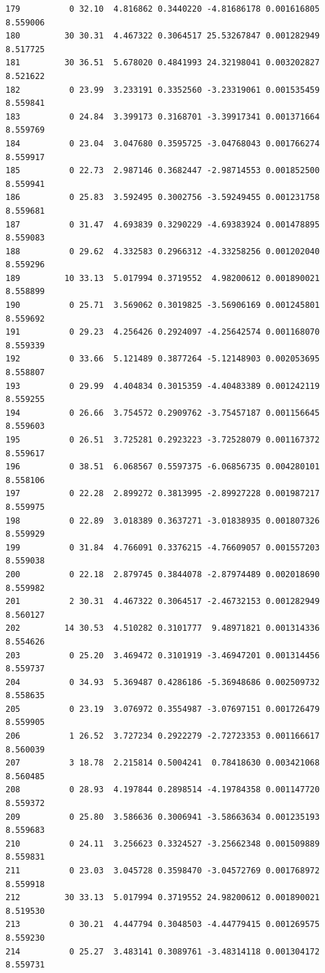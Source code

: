 \documentclass[]{book}
\theoremstyle{definition}
\theoremstyle{definition}
\theoremstyle{definition}
\theoremstyle{remark}
\begin{document}
\begin{verbatim}
179          0 32.10  4.816862 0.3440220 -4.81686178 0.001616805 8.559006
180         30 30.31  4.467322 0.3064517 25.53267847 0.001282949 8.517725
181         30 36.51  5.678020 0.4841993 24.32198041 0.003202827 8.521622
182          0 23.99  3.233191 0.3352560 -3.23319061 0.001535459 8.559841
183          0 24.84  3.399173 0.3168701 -3.39917341 0.001371664 8.559769
184          0 23.04  3.047680 0.3595725 -3.04768043 0.001766274 8.559917
185          0 22.73  2.987146 0.3682447 -2.98714553 0.001852500 8.559941
186          0 25.83  3.592495 0.3002756 -3.59249455 0.001231758 8.559681
187          0 31.47  4.693839 0.3290229 -4.69383924 0.001478895 8.559083
188          0 29.62  4.332583 0.2966312 -4.33258256 0.001202040 8.559296
189         10 33.13  5.017994 0.3719552  4.98200612 0.001890021 8.558899
190          0 25.71  3.569062 0.3019825 -3.56906169 0.001245801 8.559692
191          0 29.23  4.256426 0.2924097 -4.25642574 0.001168070 8.559339
192          0 33.66  5.121489 0.3877264 -5.12148903 0.002053695 8.558807
193          0 29.99  4.404834 0.3015359 -4.40483389 0.001242119 8.559255
194          0 26.66  3.754572 0.2909762 -3.75457187 0.001156645 8.559603
195          0 26.51  3.725281 0.2923223 -3.72528079 0.001167372 8.559617
196          0 38.51  6.068567 0.5597375 -6.06856735 0.004280101 8.558106
197          0 22.28  2.899272 0.3813995 -2.89927228 0.001987217 8.559975
198          0 22.89  3.018389 0.3637271 -3.01838935 0.001807326 8.559929
199          0 31.84  4.766091 0.3376215 -4.76609057 0.001557203 8.559038
200          0 22.18  2.879745 0.3844078 -2.87974489 0.002018690 8.559982
201          2 30.31  4.467322 0.3064517 -2.46732153 0.001282949 8.560127
202         14 30.53  4.510282 0.3101777  9.48971821 0.001314336 8.554626
203          0 25.20  3.469472 0.3101919 -3.46947201 0.001314456 8.559737
204          0 34.93  5.369487 0.4286186 -5.36948686 0.002509732 8.558635
205          0 23.19  3.076972 0.3554987 -3.07697151 0.001726479 8.559905
206          1 26.52  3.727234 0.2922279 -2.72723353 0.001166617 8.560039
207          3 18.78  2.215814 0.5004241  0.78418630 0.003421068 8.560485
208          0 28.93  4.197844 0.2898514 -4.19784358 0.001147720 8.559372
209          0 25.80  3.586636 0.3006941 -3.58663634 0.001235193 8.559683
210          0 24.11  3.256623 0.3324527 -3.25662348 0.001509889 8.559831
211          0 23.03  3.045728 0.3598470 -3.04572769 0.001768972 8.559918
212         30 33.13  5.017994 0.3719552 24.98200612 0.001890021 8.519530
213          0 30.21  4.447794 0.3048503 -4.44779415 0.001269575 8.559230
214          0 25.27  3.483141 0.3089761 -3.48314118 0.001304172 8.559731

\end{verbatim}
\end{document}

